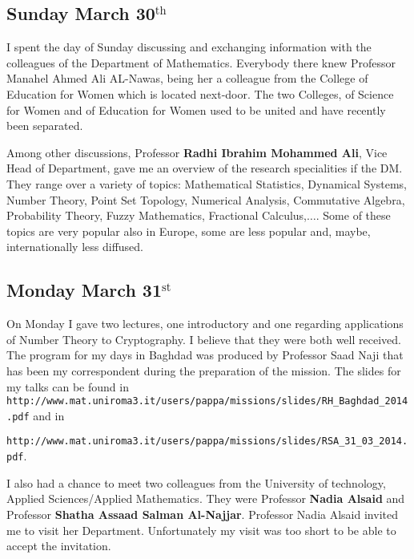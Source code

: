 \documentclass[12pt,a4paper]{scrartcl}
\begin{document}
\subsection{Sunday March 30$^{\textrm{th}}$}
I spent the day of Sunday discussing and exchanging information with the colleagues of the Department of Mathematics. Everybody there knew Professor Manahel
Ahmed Ali AL-Nawas, being her a colleague from the College of Education for Women which is located next-door.  The two Colleges, of Science for Women and of Education for Women
used to be united and have recently been separated.

Among other discussions, Professor \textbf{Radhi Ibrahim Mohammed Ali}, Vice Head of Department, gave me an overview of the research specialities if the DM. They range over
a variety of topics: Mathematical Statistics, Dynamical Systems, Number Theory, Point Set Topology, Numerical Analysis, Commutative Algebra, Probability Theory, Fuzzy Mathematics,
Fractional Calculus,$\ldots$. Some of these topics are very popular also in Europe, some are less popular and, maybe, internationally less diffused. 
 
\subsection{Monday March 31$^{\textrm{st}}$}

On Monday I gave two lectures, one introductory and one regarding applications of Number Theory to Cryptography. I believe that they were both
well received. The program for my days in Baghdad was produced by Professor Saad Naji that has been my correspondent during the
preparation of the mission. The slides for my talks can be found in\hfill \\
\texttt{http://www.mat.uniroma3.it/users/pappa/missions/slides/RH\_Baghdad\_2014.pdf} and in

\noindent \texttt{http://www.mat.uniroma3.it/users/pappa/missions/slides/RSA\_31\_03\_2014.pdf}.

I also had a chance to meet two colleagues from the University of technology,
Applied Sciences/Applied Mathematics. They were Professor \textbf{Nadia Alsaid} %
and  Professor \textbf{Shatha Assaad Salman Al-Najjar}. %
Professor Nadia Alsaid invited me to visit her Department. Unfortunately my visit was too short to be able to accept the 
invitation.
\end{document}
